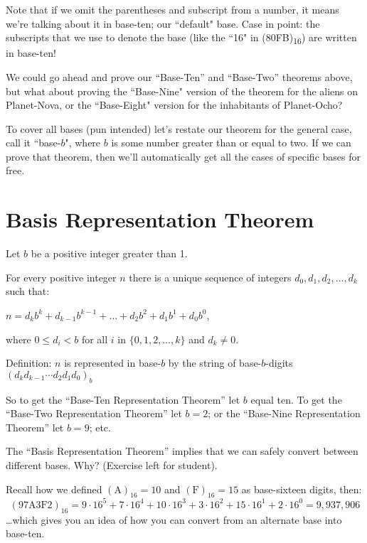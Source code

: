 \documentclass{article}
\newenvironment{jprIn}{\begin{adjustwidth}{2em}{}}{\end{adjustwidth}}
\begin{document}
Note that if we omit the parentheses and subscript from a number,
it means we're talking about it in base-ten; our ``default" base.
Case in point: the subscripts that we use to denote the base
(like the ``16" in (80FB)\textsubscript{16}) are written in base-ten!

We could go ahead and prove our ``Base-Ten'' and ``Base-Two'' theorems above,
but what about proving the ``Base-Nine" version of the theorem for the aliens on Planet-Nova,
or the ``Base-Eight" version for the inhabitants of Planet-Ocho?

To cover all bases (pun intended) let's restate our theorem for the general case,
call it ``base-$b$",
where $b$ is some number greater than or equal to two.
If we can prove that theorem,
then we'll automatically get all the cases of specific bases for free.

\section*{Basis Representation Theorem}
\begin{jprIn}
Let $b$ be a positive integer greater than 1.

For every positive integer $n$ there is a unique sequence
of integers $d_0, d_1, d_2,\dots{},d_k$ such that:

\hspace{3em}$n=d_kb^k+d_{k-1}b^{k-1}+\dots+d_2b^2+d_1b^1+d_0b^0$,

where $0\le{}d_i<b$ for all $i$ in $\{0,1,2,\dots{},k\}$ and $d_k\ne0$.

Definition: $n$ is represented in base-$b$ by the string
of base-$b$-digits $(d_kd_{k-1}{\cdots}d_2d_1d_0)_b$
\end{jprIn}
\bigskip

So to get the ``Base-Ten Representation Theorem'' let $b$ equal ten.
To get the ``Base-Two Representation Theorem'' let $b=2$; or the ``Base-Nine Representation Theorem''
let $b=9$; etc.

\bigskip
The ``Basis Representation Theorem''
implies that we can safely convert between
different bases. Why? (Exercise left for student).

Recall how we defined $(\text{A})_{16}=10$
and $(\text{F})_{16}=15$ as base-sixteen digits, then:
\[
(\text{97A3F2})_{16}=9\cdot{}16^5+7\cdot{}16^4+10\cdot{}16^3+3\cdot{}16^2+15\cdot{}16^1+2\cdot{}16^0=9,937,906\]
\dots{}which gives you an idea of how you can convert from an alternate base into base-ten.
\end{document}
